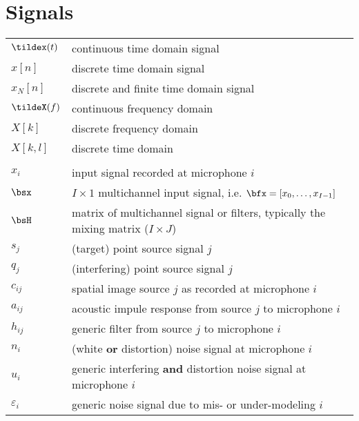 \section*{Signals}
\begin{table}[H]
    \begin{tabular}{ll}
        $\tildex(t)$    & continuous time domain signal\\
        $x[n]$          & discrete time domain signal\\
        $x_N[n]$          & discrete and finite time domain signal\\
        $\tildeX(f)$    & continuous frequency domain\\
        $X[k]$          & discrete frequency domain\\
        $X[k,l]$        & discrete time domain\\
                        &                     \\
        $x_i$     & input signal recorded at microphone $i$\\
        $\bsx$    & $I \times 1$ multichannel input signal, i.e. $\bfx = [x_0, \ldots, x_{I-1}]$ \\
        $\bsH$    & matrix of multichannel signal or filters, typically the mixing matrix ($I \times J$)\\
        $s_j$     & (target) point source signal $j$ \\
        $q_j$     & (interfering) point source signal $j$ \\
        $c_{ij}$  & spatial image source $j$ as recorded at microphone $i$\\
        $a_{ij}$  & acoustic impule response from source $j$ to microphone $i$ \\
        $h_{ij}$  & generic filter from source $j$ to microphone $i$ \\
        $n_{i}$   & (white \textbf{or} distortion) noise signal at microphone $i$\\
        $u_{i}$   & generic interfering \textbf{and} distortion noise signal at microphone $i$ \\
        $\varepsilon_{i}$   & generic noise signal due to mis- or under-modeling $i$ \\
    \end{tabular}
\end{table}

